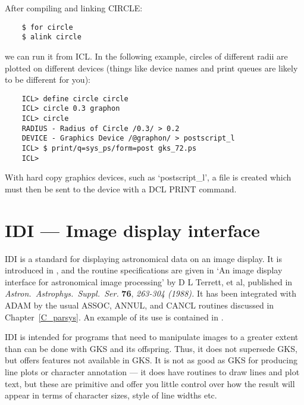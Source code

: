 After compiling and linking CIRCLE:

\begin{small}
\begin{verbatim}
    $ for circle
    $ alink circle
\end{verbatim}
\end{small}

we can run it from ICL.
In the following example, circles of different radii are plotted on different
devices (things like device names and print queues are likely to be different
for you):

\begin{small}
\begin{verbatim}
    ICL> define circle circle
    ICL> circle 0.3 graphon
    ICL> circle
    RADIUS - Radius of Circle /0.3/ > 0.2
    DEVICE - Graphics Device /@graphon/ > postscript_l
    ICL> $ print/q=sys_ps/form=post gks_72.ps
    ICL>
\end{verbatim}
\end{small}

With hard copy graphics devices, such as `postscript\_l', a file is created
which must then be sent to the device with a DCL PRINT command.

\section{IDI --- Image display interface}

IDI is a standard for displaying astronomical data on an image display.
It is introduced in , and the routine specifications are
given in
`An image display interface for astronomical image processing' by D L Terrett,
et al, published in {\em Astron.\ Astrophys.\ Suppl.\ Ser.} {\bf 76},
{\em 263-304 (1988).}
It has been integrated with ADAM by the usual ASSOC, ANNUL, and CANCL routines
discussed in Chapter~\ref{C_parsys}.
An example of its use is contained in .

IDI is intended for programs that need to manipulate images to a greater extent
than can be done with GKS and its offspring.
Thus, it does not supersede GKS, but offers features not available in GKS.
It is not as good as GKS for producing line plots or character annotation ---
it does have routines to draw lines and plot text, but these are primitive and
offer you little control over how the result will appear in terms of character
sizes, style of line widths etc.

